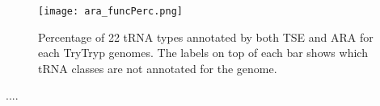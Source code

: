 \documentclass[
10pt, %
a4paper, %
oneside, %
headinclude,footinclude, %
BCOR5mm, %
]{scrartcl}
\begin{document}
\begin{figure}[tb]
\centering 
\texttt{[image: ara\_funcPerc.png]} 
\caption[Genome Comparison]{Percentage of 22 tRNA types annotated by both TSE and ARA for each TryTryp genomes. The labels on top of each bar shows which tRNA classes are not annotated for the genome.} %
\label{fig:types} 
\end{figure}




....
\newpage
\renewcommand{\refname}{\spacedlowsmallcaps{References}} %




\end{document}
